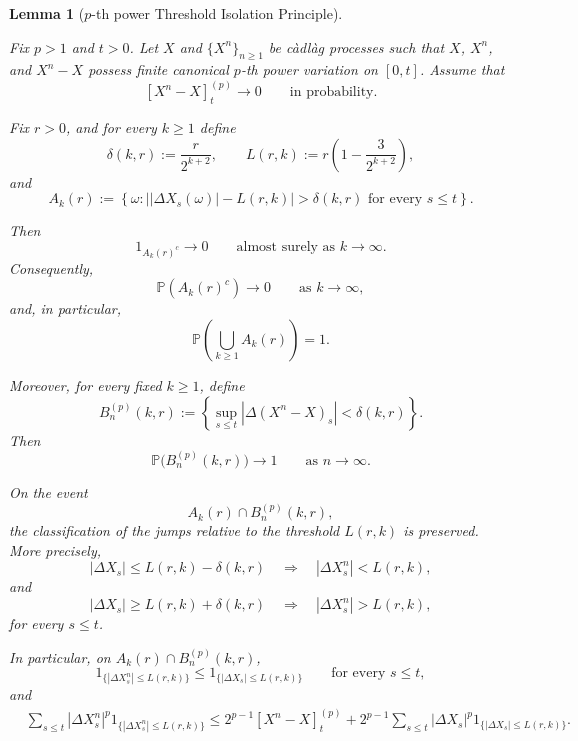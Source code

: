 \documentclass[a4paper,10pt]{article}
\newtheorem{lemma}[thm]{Lemma}
\renewcommand{\P}{\mathbb P}
\begin{document}
\begin{lemma}[\(p\)-th power Threshold Isolation Principle]
\label{lem:p-thres}

Fix \(p>1\) and \(t>0\). Let \(X\) and
\(\{X^n\}_{n\ge1}\) be càdlàg
processes such that \(X\), \(X^n\), and \(X^n-X\) possess finite
canonical \(p\)-th power variation on \([0,t]\). Assume that
\[
        [X^n-X]^{(p)}_t
        \longrightarrow0
        \qquad\text{in probability}.
\]

Fix \(r>0\), and for every \(k\ge1\) define
\[
\delta(k,r):=\frac{r}{2^{k+2}},
\qquad
L(r,k):=
r\left(1-\frac{3}{2^{k+2}}\right),
\]
and
\[
A_k(r)
:=
\left\{
\omega:
\bigl||\Delta X_s(\omega)|-L(r,k)\bigr|
>
\delta(k,r)
\text{ for every }s\le t
\right\}.
\]

Then
\[
1_{A_k(r)^c}\longrightarrow0
\qquad\text{almost surely as }k\to\infty.
\]
Consequently,
\[
\P(A_k(r)^c)\longrightarrow0
\qquad\text{as }k\to\infty,
\]
and, in particular,
\[
\P\left(\bigcup_{k\ge1}A_k(r)\right)=1.
\]

Moreover, for every fixed \(k\ge1\), define
\[
B_n^{(p)}(k,r)
:=
\left\{
\sup_{s\le t}
|\Delta(X^n-X)_s|
<
\delta(k,r)
\right\}.
\]
Then
\[
\P\bigl(B_n^{(p)}(k,r)\bigr)
\longrightarrow1
\qquad\text{as }n\to\infty.
\]

On the event
\[
A_k(r)\cap B_n^{(p)}(k,r),
\]
the classification of the jumps relative to the threshold \(L(r,k)\)
is preserved. More precisely,
\[
|\Delta X_s|
\le
L(r,k)-\delta(k,r)
\quad\Longrightarrow\quad
|\Delta X^n_s|<L(r,k),
\]
and
\[
|\Delta X_s|
\ge
L(r,k)+\delta(k,r)
\quad\Longrightarrow\quad
|\Delta X^n_s|>L(r,k),
\]
for every \(s\le t\).

In particular, on \(A_k(r)\cap B_n^{(p)}(k,r)\),
\[
1_{\{|\Delta X^n_s|\le L(r,k)\}}
\le
1_{\{|\Delta X_s|\le L(r,k)\}}
\qquad\text{for every }s\le t,
\]
and
\[
\begin{aligned}
&\sum_{s\le t}
|\Delta X^n_s|^p
1_{\{|\Delta X^n_s|\le L(r,k)\}}
\le
2^{p-1}[X^n-X]^{(p)}_t
+
2^{p-1}
\sum_{s\le t}
|\Delta X_s|^p
1_{\{|\Delta X_s|\le L(r,k)\}}.
\end{aligned}
\]
\end{lemma}
\end{document}
